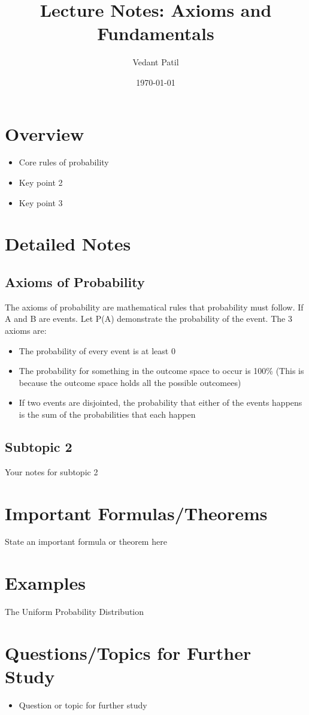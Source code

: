 \documentclass[12pt,a4paper]{article}
\title{Lecture Notes: Axioms and Fundamentals}
\author{Vedant Patil}
\date{\today}
\begin{document}
\maketitle

\section{Overview}
\begin{tcolorbox}[colback=yellow!10!white,colframe=yellow!50!black,title=Key Points]
  \begin{itemize}
    \item Core rules of probability 
    \item Key point 2
    \item Key point 3
  \end{itemize}
\end{tcolorbox}

\section{Detailed Notes}
\subsection{Axioms of Probability}
The axioms of probability are mathematical rules that probability must follow.
If A and B are events. Let P(A) demonstrate the probability of the event. The 3 axioms are: 
\begin{itemize}
  \item The probability of every event is at least 0 
  \item The probability for something in the outcome space to occur is 100\% (This is because the outcome space holds all the possible outcomees)
  \item If two events are disjointed, the probability that either of the events happens is the sum of the probabilities that each happen 
\end{itemize}


\subsection{Subtopic 2}
Your notes for subtopic 2

\section{Important Formulas/Theorems}
\begin{tcolorbox}[colback=blue!5!white,colframe=blue!75!black,title=Key Formula/Theorem]
  State an important formula or theorem here
\end{tcolorbox}

\section{Examples}
\begin{tcolorbox}
 The Uniform Probability Distribution 
\end{tcolorbox}

\section{Questions/Topics for Further Study}
\begin{itemize}
  \item Question or topic for further study
\end{itemize}
\end{document}
